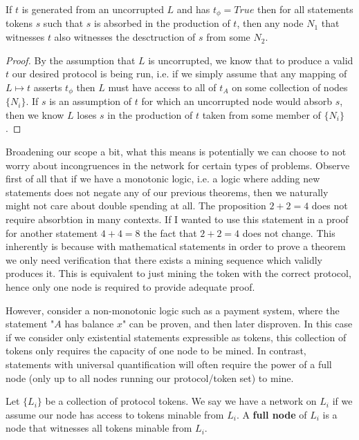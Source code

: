 \documentclass[12pt]{amsart}
\begin{document}
\begin{thm}
 If $t$ is generated from an uncorrupted $L$ and has $t_\phi = True$ then for all statements tokens $s$ such that $s$ is absorbed in the production of $t$, then any node $N_1$ that witnesses $t$ also witnesses the desctruction of $s$ from some $N_2$.
\end{thm}
\begin{proof}
By the assumption that $L$ is uncorrupted, we know that to produce a valid $t$ our desired protocol is being run, i.e. if we simply assume that any mapping of $L\mapsto t$ asserts $t_\phi$ then $L$ must have access to all of $t_A$ on some collection of nodes $\{N_i\}$. If $s$ is an assumption of $t$ for which an uncorrupted node would absorb $s$, then we know $L$ loses $s$ in the production of $t$ taken from some member of $\{N_i\}$.
\end{proof}

Broadening our scope a bit, what this means is potentially we can choose to not worry about incongruences in the network for certain types of problems. Observe first of all that if we have a monotonic logic, i.e. a logic where adding new statements does not negate any of our previous theorems, then we naturally might not care about double spending at all. The proposition $2+2 = 4$ does not require absorbtion in many contexts. If I wanted to use this statement in a proof for another statement $4 + 4 = 8$ the fact that $2 +2 = 4$ does not change. This inherently is because with mathematical statements in order to prove a theorem we only need verification that there exists a mining sequence which validly produces it. This is equivalent to just mining the token with the correct protocol, hence only one node is required to provide adequate proof. \newline

However, consider a non-monotonic logic such as a payment system, where the statement "$A$ has balance $x$" can be proven, and then later disproven. In this case if we consider only existential statements expressible as tokens, this collection of tokens only requires the capacity of one node to be mined. In contrast, statements with universal quantification will often require the power of a full node (only up to all nodes running our protocol/token set) to mine.

Let $\{L_i\}$ be a collection of protocol tokens. We say we have a network on $L_i$ if we assume our node has access to tokens minable from $L_i$. A \textbf{full node} of $L_i$ is a node that witnesses all tokens minable from $L_i$.
\end{document}
